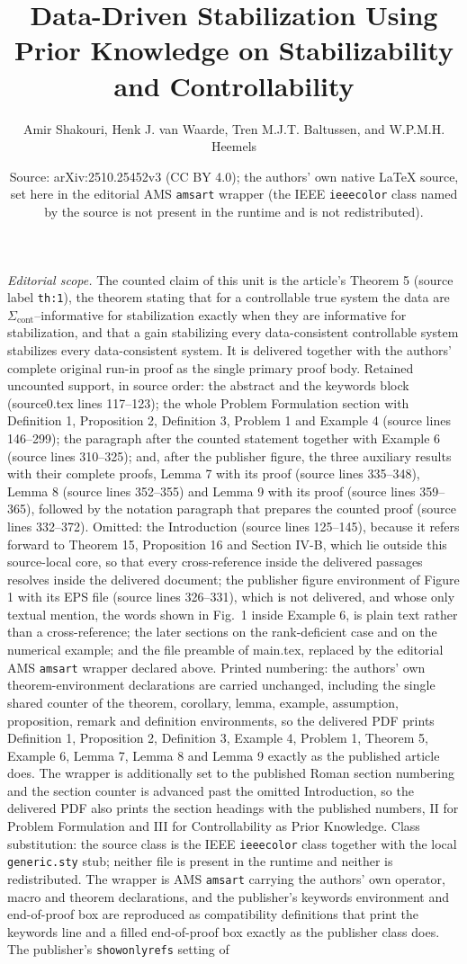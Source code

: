 \documentclass[10pt,a4paper]{amsart}
\title{Data-Driven Stabilization Using Prior Knowledge on Stabilizability and Controllability}
\author{Amir Shakouri, Henk J. van Waarde, Tren M.J.T. Baltussen, and W.P.M.H. Heemels}
\date{Source: arXiv:2510.25452v3 (CC BY 4.0); the authors' own native \LaTeX{} source, set here in the editorial AMS \texttt{amsart} wrapper (the IEEE \texttt{ieeecolor} class named by the source is not present in the runtime and is not redistributed).}
\begin{document}
\maketitle
\noindent\textit{Editorial scope.} The counted claim of this unit is the article's Theorem 5 (source label \texttt{th:1}), the theorem stating that for a controllable true system the data are $\Sigma_\text{cont}$--informative for stabilization exactly when they are informative for stabilization, and that a gain stabilizing every data-consistent controllable system stabilizes every data-consistent system. It is delivered together with the authors' complete original run-in proof as the single primary proof body. Retained uncounted support, in source order: the abstract and the keywords block (source0.tex lines 117--123); the whole Problem Formulation section with Definition 1, Proposition 2, Definition 3, Problem 1 and Example 4 (source lines 146--299); the paragraph after the counted statement together with Example 6 (source lines 310--325); and, after the publisher figure, the three auxiliary results with their complete proofs, Lemma 7 with its proof (source lines 335--348), Lemma 8 (source lines 352--355) and Lemma 9 with its proof (source lines 359--365), followed by the notation paragraph that prepares the counted proof (source lines 332--372). Omitted: the Introduction (source lines 125--145), because it refers forward to Theorem 15, Proposition 16 and Section IV-B, which lie outside this source-local core, so that every cross-reference inside the delivered passages resolves inside the delivered document; the publisher figure environment of Figure 1 with its EPS file (source lines 326--331), which is not delivered, and whose only textual mention, the words shown in Fig.~1 inside Example 6, is plain text rather than a cross-reference; the later sections on the rank-deficient case and on the numerical example; and the file preamble of main.tex, replaced by the editorial AMS \texttt{amsart} wrapper declared above. Printed numbering: the authors' own theorem-environment declarations are carried unchanged, including the single shared counter of the theorem, corollary, lemma, example, assumption, proposition, remark and definition environments, so the delivered PDF prints Definition 1, Proposition 2, Definition 3, Example 4, Problem 1, Theorem 5, Example 6, Lemma 7, Lemma 8 and Lemma 9 exactly as the published article does. The wrapper is additionally set to the published Roman section numbering and the section counter is advanced past the omitted Introduction, so the delivered PDF also prints the section headings with the published numbers, II for Problem Formulation and III for Controllability as Prior Knowledge. Class substitution: the source class is the IEEE \texttt{ieeecolor} class together with the local \texttt{generic.sty} stub; neither file is present in the runtime and neither is redistributed. The wrapper is AMS \texttt{amsart} carrying the authors' own operator, macro and theorem declarations, and the publisher's keywords environment and end-of-proof box are reproduced as compatibility definitions that print the keywords line and a filled end-of-proof box exactly as the publisher class does. The publisher's \texttt{showonlyrefs} setting of 
\end{document}
